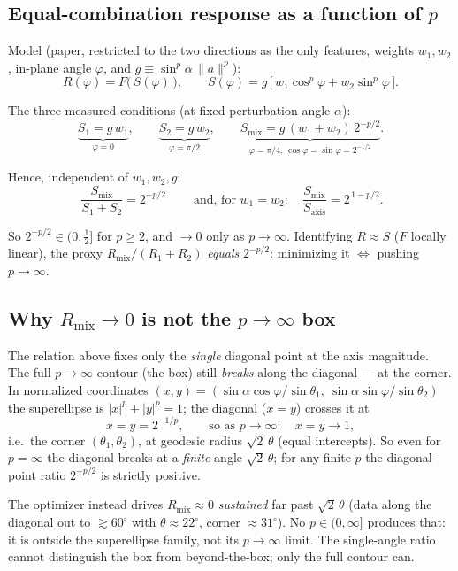 \documentclass[11pt]{article}
\begin{document}
\subsection*{Equal-combination response as a function of $p$}

Model (paper, restricted to the two directions as the only features, weights
$w_1,w_2$, in-plane angle $\varphi$, and $g \equiv \sin^p\!\alpha\,\|a\|^p$):
\[
R(\varphi) = F\!\big(\, S(\varphi) \,\big),
\qquad
S(\varphi) = g\,\big[\, w_1\cos^p\varphi + w_2\sin^p\varphi \,\big].
\]

The three measured conditions (at fixed perturbation angle $\alpha$):
\[
\underbrace{S_1 = g\,w_1}_{\varphi=0},
\qquad
\underbrace{S_2 = g\,w_2}_{\varphi=\pi/2},
\qquad
\underbrace{S_{\mathrm{mix}} = g\,(w_1+w_2)\,2^{-p/2}}_{\varphi=\pi/4,\ \cos\varphi=\sin\varphi=2^{-1/2}}.
\]

Hence, independent of $w_1,w_2,g$:
\[
\boxed{\ \frac{S_{\mathrm{mix}}}{S_1+S_2} = 2^{-p/2}\ }
\qquad\text{and, for }w_1=w_2:\quad
\frac{S_{\mathrm{mix}}}{S_{\mathrm{axis}}} = 2^{\,1-p/2}.
\]

So $2^{-p/2}\in(0,\tfrac12]$ for $p\ge 2$, and $\to 0$ only as $p\to\infty$.
Identifying $R\approx S$ ($F$ locally linear), the proxy
$R_{\mathrm{mix}}/(R_1+R_2)$ \emph{equals} $2^{-p/2}$: minimizing it
$\Leftrightarrow$ pushing $p\to\infty$.

\subsection*{Why $R_{\mathrm{mix}}\to 0$ is not the $p\to\infty$ box}

The relation above fixes only the \emph{single} diagonal point at the axis
magnitude. The full $p\to\infty$ contour (the box) still \emph{breaks} along the
diagonal --- at the corner. In normalized coordinates
$(x,y)=(\sin\alpha\cos\varphi/\sin\theta_1,\ \sin\alpha\sin\varphi/\sin\theta_2)$
the superellipse is $|x|^p+|y|^p=1$; the diagonal ($x=y$) crosses it at
\[
x = y = 2^{-1/p},
\qquad\text{so as }p\to\infty:\quad x=y\to 1,
\]
i.e.\ the corner $(\theta_1,\theta_2)$, at geodesic radius $\sqrt{2}\,\theta$
(equal intercepts). So even for $p=\infty$ the diagonal breaks at a
\emph{finite} angle $\sqrt2\,\theta$; for any finite $p$ the diagonal-point
ratio $2^{-p/2}$ is strictly positive.

The optimizer instead drives $R_{\mathrm{mix}}\approx 0$ \emph{sustained} far
past $\sqrt2\,\theta$ (data along the diagonal out to $\gtrsim 60^\circ$ with
$\theta\approx 22^\circ$, corner $\approx 31^\circ$). No $p\in(0,\infty]$
produces that: it is outside the superellipse family, not its $p\to\infty$
limit. The single-angle ratio cannot distinguish the box from beyond-the-box;
only the full contour can.
\end{document}
